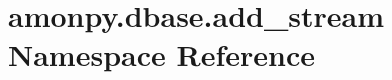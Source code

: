 \hypertarget{namespaceamonpy_1_1dbase_1_1add__stream}{\section{amonpy.\-dbase.\-add\-\_\-stream Namespace Reference}
\label{namespaceamonpy_1_1dbase_1_1add__stream}
}
